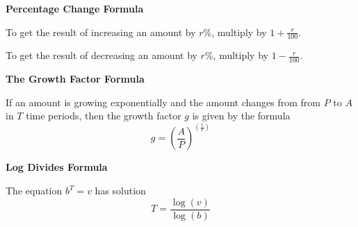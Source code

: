 \documentclass[12pt]{article}
\begin{document}
  \begin{center}
\textbf{Percentage Change Formula}
\vspace{.1in}

To get the result of increasing an amount by $r$\%, multiply by $1+\frac{r}{100}.$
\vspace{.1in}

To get the result of decreasing an amount by $r$\%, multiply by $1-\frac{r}{100}.$
 \end{center}
 
  \vspace{.1in}
    \hrulefill
 \vspace{.1in}
 
 \begin{center}
\textbf{The Growth Factor Formula}
\vspace{.1in}

If an amount is growing exponentially and the amount changes from from $P$ to $A$ \\ in $T$ time periods, then the growth factor $g$ is given by the formula $$g=\left(\frac{A}{P}\right)^{\left(\frac{1}{T}\right)}$$

 \end{center}
 
  \vspace{.1in}
    \hrulefill
 \vspace{.1in}
 
 \begin{center}
 \textbf{Log Divides Formula}
 \vspace{.1 in}
 
 The equation $b^T=v$ has solution $$T=\frac{\log(v)}{\log(b)}$$
 
 \end{center}

\hrulefill
\end{document}
